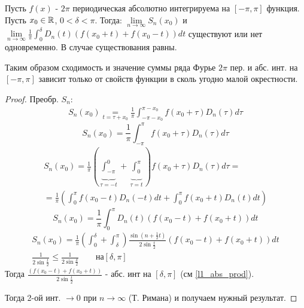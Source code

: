 \documentclass{article}
\begin{document}
\begin{theorem}
  Пусть $f(x)$ - $2\pi$ периодическая абсолютно интегрируема на $[-\pi,\pi]$ функция.
  Пусть $x_0\in\mathbb{R}$, $0<\delta<\pi$. Тогда: $\lim\limits_{n\to\infty}S_n(x_0)$ и
  $\lim\limits_{n\to\infty}\frac{1}{\pi}\int_{0}^{\delta}D_n(t)(f(x_0+t)+f(x_0-t))dt$
  существуют или нет одновременно. В случае существования равны.
\end{theorem}
\begin{remark}
  Таким образом сходимость и значение суммы ряда Фурье $2\pi$ пер. и абс. инт.
  на $[-\pi,\pi]$ зависит только от свойств функции в сколь угодно малой окрестности.
\end{remark}
\begin{proof}
  Преобр. $S_n$:
  \begin{gather*}
    S_n(x_0)\underset{t=\tau+x_0}{=}\frac{1}{\pi}\int_{-\pi-x_0}^{\pi-x_0}f(x_0+\tau)D_n(\tau)d\tau 
  \end{gather*}
  \begin{equation}\label{l2_3a}
    S_n(x_0)=\frac{1}{\pi}\int_{-\pi}^{\pi}f(x_0+\tau)D_n(\tau)d\tau 
  \end{equation}
  \begin{gather*}
    S_n(x_0)=\frac{1}{\pi}(\underbrace{\int_{-\pi}^{0}}_{\tau=-t}+\underbrace{\int_{0}^{\pi}}_{\tau=t})f(x_0+\tau)D_n(\tau)d\tau = \\ 
    =\frac{1}{\pi}(\int_{0}^{\pi}f(x_0-t)D_n(-t)dt + \int_{0}^{\pi}f(x_0+t)D_n(t)dt)
  \end{gather*}
  \begin{equation}\label{l2_3b}
    S_n(x_0)=\frac{1}{\pi}\int_{0}^{\pi}D_n(t)(f(x_0-t)+f(x_0+t))dt
  \end{equation}
  \begin{gather*}
    S_n(x_0)=\frac{1}{\pi}(\int_{0}^{\delta}+\int_{\delta}^{\pi})\frac{\sin(n+\frac{1}{2}t)}{2\sin \frac{t}{2}}(f(x_0-t)+f(x_0+t))dt \\
    \frac{1}{2\sin\frac{t}{2}} \le \frac{1}{2\sin \frac{\delta}{2}} \qquad \text{на} [\delta,\pi]
  \end{gather*}
  Тогда $\frac{(f(x_0-t)+f(x_0+t))}{2\sin \frac{t}{2}}$ - абс. инт на $[\delta,\pi]$ (см \ref{l1_abs_prod}).

  Тогда 2-ой инт. $\to0$ при $n\to\infty$ (Т. Римана) и получаем нужный результат.
\end{proof}

\end{document}
